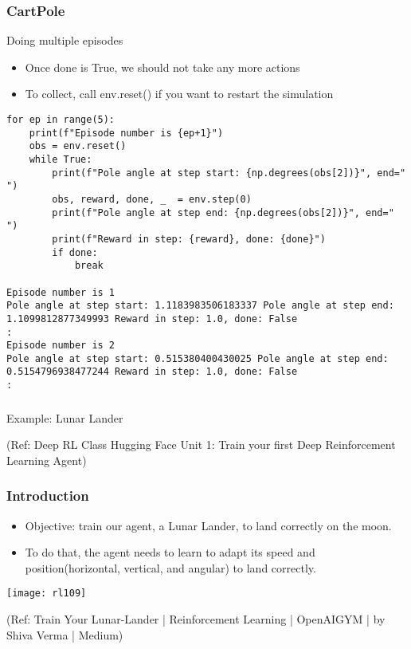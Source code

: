 \begin{frame}[fragile]\frametitle{CartPole}

Doing multiple episodes
\begin{itemize}
\item Once done is True, we should not take any more actions
\item To collect, call env.reset() if you want to restart the simulation
\end{itemize}

\begin{lstlisting}
for ep in range(5):
    print(f"Episode number is {ep+1}")
    obs = env.reset()
    while True:
        print(f"Pole angle at step start: {np.degrees(obs[2])}", end=" ")
        obs, reward, done, _  = env.step(0)
        print(f"Pole angle at step end: {np.degrees(obs[2])}", end=" ")
        print(f"Reward in step: {reward}, done: {done}")
        if done:
            break
						
Episode number is 1
Pole angle at step start: 1.1183983506183337 Pole angle at step end: 1.1099812877349993 Reward in step: 1.0, done: False
:
Episode number is 2
Pole angle at step start: 0.515380400430025 Pole angle at step end: 0.5154796938477244 Reward in step: 1.0, done: False
:
\end{lstlisting}

\end{frame}

\begin{frame}[fragile]\frametitle{}
\begin{center}
{\Large Example: Lunar Lander}
\end{center}

{\tiny (Ref: Deep RL Class Hugging Face Unit 1: Train your first Deep Reinforcement Learning Agent)}

\end{frame}

\begin{frame}[fragile]\frametitle{Introduction}

\begin{itemize}
\item Objective:  train our agent, a Lunar Lander, to land correctly on the moon. 
\item To do that, the agent needs to learn to adapt its speed and position(horizontal, vertical, and angular) to land correctly.
\end{itemize}

\begin{center}
\texttt{[image: rl109]}

{\tiny (Ref: Train Your Lunar-Lander | Reinforcement Learning | OpenAIGYM | by Shiva Verma | Medium)}

\end{center}



\end{frame}

